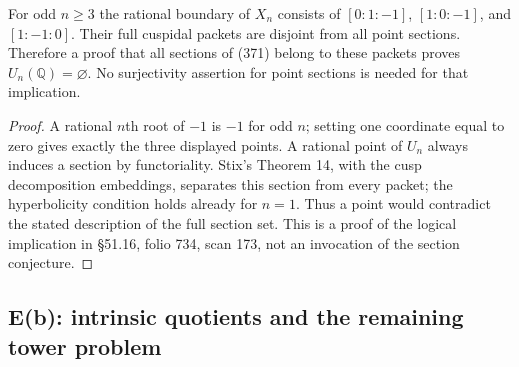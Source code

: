 \begin{proposition}
\label{E-fermat-implication}
For odd $n\geq3$ the rational boundary of $X_n$ consists
of $[0:1:-1]$, $[1:0:-1]$, and $[1:-1:0]$.
Their full cuspidal packets are disjoint from all point
sections. Therefore a proof that all sections of (371)
belong to these packets proves $U_n(\mathbb Q)=\varnothing$.
No surjectivity assertion for point sections is needed
for that implication.
\end{proposition}
\begin{proof}
A rational $n$th root of $-1$ is $-1$ for odd $n$;
setting one coordinate equal to zero gives exactly
the three displayed points. A rational point of $U_n$
always induces a section by functoriality. Stix's
Theorem 14, with the cusp decomposition embeddings,
separates this section from every packet; the
hyperbolicity condition holds already for $n=1$.
Thus a point would contradict the stated description
of the full section set. This is a proof of the
logical implication in \S51.16, folio 734, scan 173,
not an invocation of the section conjecture.
\end{proof}

\subsection{E(b): intrinsic quotients and the remaining tower problem}

